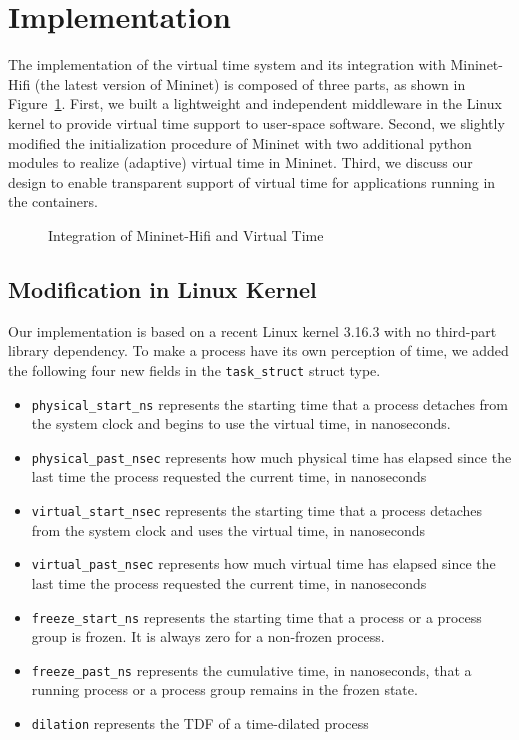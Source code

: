 \section{Implementation}
\label{VT:Sec:Implementation}

The implementation of the virtual time system and its integration with Mininet-Hifi (the latest version of Mininet) is composed of three parts,
as shown in Figure~\ref{VT:Fig:VTMininetHifi}.
First, we built a lightweight and independent middleware in the Linux kernel to provide virtual time support to user-space software.
Second, we slightly modified the initialization procedure of Mininet with two additional python modules to realize (adaptive) virtual time in Mininet.
Third, we discuss our design to enable transparent support of virtual time for applications running in the containers.

\begin{figure}
    \centering
    \caption{Integration of Mininet-Hifi and Virtual Time}
    \label{VT:Fig:VTMininetHifi}
\end{figure}

\subsection{Modification in Linux Kernel}
\label{VT:SubSec:ExtendLinuxKernel}
Our implementation is based on a recent Linux kernel 3.16.3 with no third-part library dependency.
To make a process have its own perception of time, we added the following four new fields in the \texttt{task\_struct} struct type.
\begin{itemize}
    \item \texttt{physical\_start\_ns} represents the starting time that a process detaches from the system clock and begins to use the virtual time, in nanoseconds.
    \item \texttt{physical\_past\_nsec} represents how much physical time has elapsed since the last time the process requested the current time, in nanoseconds
    \item \texttt{virtual\_start\_nsec} represents the starting time that a process detaches from the system clock and uses the virtual time, in nanoseconds 
    \item \texttt{virtual\_past\_nsec} represents how much virtual time has elapsed since the last time the process requested the current time, in nanoseconds
    \item \texttt{freeze\_start\_ns} represents the starting time that a process or a process group is frozen. It is always zero for a non-frozen process.
    \item \texttt{freeze\_past\_ns} represents the cumulative time, in nanoseconds, that a running process or a process group remains in the frozen state.
    \item \texttt{dilation} represents the TDF of a time-dilated process
\end{itemize}

